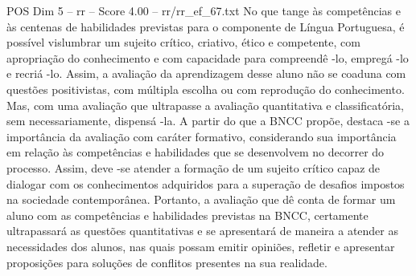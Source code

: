 \begin{textsample}{POS Dim 5 – rr – Score 4.00 – rr/rr\_ef\_67.txt}
No que tange às competências e às centenas de habilidades previstas para o componente de Língua Portuguesa, é possível vislumbrar um sujeito crítico, criativo, ético e competente, com apropriação do conhecimento e com capacidade para compreendê -lo, empregá -lo e recriá -lo.
Assim, a avaliação da aprendizagem desse aluno não se coaduna com questões positivistas, com múltipla escolha ou com reprodução do conhecimento.
Mas, com uma avaliação que ultrapasse a avaliação quantitativa e classificatória, sem necessariamente, dispensá -la.
A partir do que a BNCC propõe, destaca -se a importância da avaliação com caráter formativo, considerando sua importância em relação às competências e habilidades que se desenvolvem no decorrer do processo.
Assim, deve -se atender a formação de um sujeito crítico capaz de dialogar com os conhecimentos adquiridos para a superação de desafios impostos na sociedade contemporânea.
Portanto, a avaliação que dê conta de formar um aluno com as competências e habilidades previstas na BNCC, certamente ultrapassará as questões quantitativas e se apresentará de maneira a atender as necessidades dos alunos, nas quais possam emitir opiniões, refletir e apresentar proposições para soluções de conflitos presentes na sua realidade.

\end{textsample}

